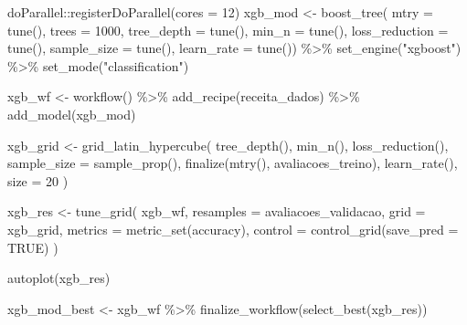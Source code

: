 \documentclass[
]{article}
\newenvironment{Shaded}{\begin{snugshade}}{\end{snugshade}}
\newcommand{\AttributeTok}[1]{\textcolor[rgb]{0.77,0.63,0.00}{#1}}
\newcommand{\ConstantTok}[1]{\textcolor[rgb]{0.00,0.00,0.00}{#1}}
\newcommand{\DecValTok}[1]{\textcolor[rgb]{0.00,0.00,0.81}{#1}}
\newcommand{\FunctionTok}[1]{\textcolor[rgb]{0.00,0.00,0.00}{#1}}
\newcommand{\NormalTok}[1]{#1}
\newcommand{\OtherTok}[1]{\textcolor[rgb]{0.56,0.35,0.01}{#1}}
\newcommand{\SpecialCharTok}[1]{\textcolor[rgb]{0.00,0.00,0.00}{#1}}
\newcommand{\StringTok}[1]{\textcolor[rgb]{0.31,0.60,0.02}{#1}}
\begin{document}
\begin{Shaded}
\begin{Highlighting}[]
\NormalTok{doParallel}\SpecialCharTok{::}\FunctionTok{registerDoParallel}\NormalTok{(}\AttributeTok{cores =} \DecValTok{12}\NormalTok{)}
\NormalTok{xgb\_mod }\OtherTok{\textless{}{-}} \FunctionTok{boost\_tree}\NormalTok{(}
  \AttributeTok{mtry =} \FunctionTok{tune}\NormalTok{(),}
  \AttributeTok{trees =} \DecValTok{1000}\NormalTok{,}
  \AttributeTok{tree\_depth =} \FunctionTok{tune}\NormalTok{(),}
  \AttributeTok{min\_n =} \FunctionTok{tune}\NormalTok{(),}
  \AttributeTok{loss\_reduction =} \FunctionTok{tune}\NormalTok{(),}
  \AttributeTok{sample\_size =} \FunctionTok{tune}\NormalTok{(),}
  \AttributeTok{learn\_rate =} \FunctionTok{tune}\NormalTok{()) }\SpecialCharTok{\%\textgreater{}\%}
  \FunctionTok{set\_engine}\NormalTok{(}\StringTok{"xgboost"}\NormalTok{) }\SpecialCharTok{\%\textgreater{}\%}
  \FunctionTok{set\_mode}\NormalTok{(}\StringTok{"classification"}\NormalTok{)}

\NormalTok{xgb\_wf }\OtherTok{\textless{}{-}} \FunctionTok{workflow}\NormalTok{() }\SpecialCharTok{\%\textgreater{}\%}
  \FunctionTok{add\_recipe}\NormalTok{(receita\_dados) }\SpecialCharTok{\%\textgreater{}\%}
  \FunctionTok{add\_model}\NormalTok{(xgb\_mod)}

\NormalTok{xgb\_grid }\OtherTok{\textless{}{-}} \FunctionTok{grid\_latin\_hypercube}\NormalTok{(}
  \FunctionTok{tree\_depth}\NormalTok{(),}
  \FunctionTok{min\_n}\NormalTok{(),}
  \FunctionTok{loss\_reduction}\NormalTok{(),}
  \AttributeTok{sample\_size =} \FunctionTok{sample\_prop}\NormalTok{(),}
  \FunctionTok{finalize}\NormalTok{(}\FunctionTok{mtry}\NormalTok{(), avaliacoes\_treino),}
  \FunctionTok{learn\_rate}\NormalTok{(),}
  \AttributeTok{size =} \DecValTok{20}
\NormalTok{ )}

\NormalTok{xgb\_res }\OtherTok{\textless{}{-}} \FunctionTok{tune\_grid}\NormalTok{(}
\NormalTok{  xgb\_wf,}
  \AttributeTok{resamples =}\NormalTok{ avaliacoes\_validacao,}
  \AttributeTok{grid =}\NormalTok{ xgb\_grid,}
         \AttributeTok{metrics =} \FunctionTok{metric\_set}\NormalTok{(accuracy),}
         \AttributeTok{control =} \FunctionTok{control\_grid}\NormalTok{(}\AttributeTok{save\_pred =} \ConstantTok{TRUE}\NormalTok{)}
\NormalTok{)}

\FunctionTok{autoplot}\NormalTok{(xgb\_res)}

\NormalTok{xgb\_mod\_best }\OtherTok{\textless{}{-}}\NormalTok{ xgb\_wf }\SpecialCharTok{\%\textgreater{}\%}
  \FunctionTok{finalize\_workflow}\NormalTok{(}\FunctionTok{select\_best}\NormalTok{(xgb\_res))}


\end{Highlighting}
\end{Shaded}
\end{document}
